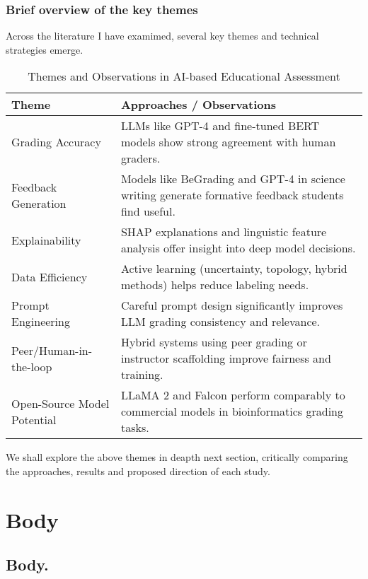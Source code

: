 \documentclass[a4paper,twoside,12pt]{report}
\begin{document}
\subsection{Brief overview of the key themes}
Across the literature I have examimed, several key themes and technical strategies emerge.

\begin{table}[h!]
  \centering
  \begin{tabular}{|p{5cm}|p{12cm}|}
  \hline
  \textbf{Theme} & \textbf{Approaches / Observations} \\
  \hline
  Grading Accuracy & LLMs like GPT-4 and fine-tuned BERT models show strong agreement with human graders. \\
  \hline
  Feedback Generation & Models like BeGrading and GPT-4 in science writing generate formative feedback students find useful. \\
  \hline
  Explainability & SHAP explanations and linguistic feature analysis offer insight into deep model decisions. \\
  \hline
  Data Efficiency & Active learning (uncertainty, topology, hybrid methods) helps reduce labeling needs. \\
  \hline
  Prompt Engineering & Careful prompt design significantly improves LLM grading consistency and relevance. \\
  \hline
  Peer/Human-in-the-loop & Hybrid systems using peer grading or instructor scaffolding improve fairness and training. \\
  \hline
  Open-Source Model Potential & LLaMA 2 and Falcon perform comparably to commercial models in bioinformatics grading tasks. \\
  \hline
  \end{tabular}
  \caption{Themes and Observations in AI-based Educational Assessment}
  \label{tab:grading_ai_themes}
  \end{table}
We shall explore the above themes in deapth next section, critically comparing the approaches, results
and proposed direction of each study.
\chapter{Body}
\section{Body.}
\end{document}
